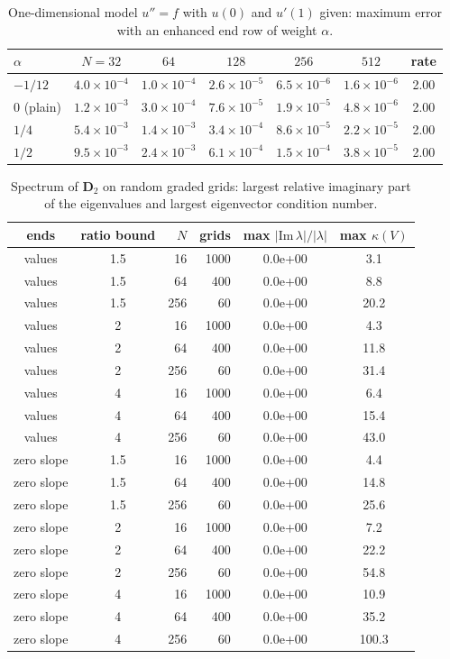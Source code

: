 \documentclass[11pt]{article}
\begin{document}
\begin{table}[htbp]\centering\small
\caption{One-dimensional model $u''=f$ with $u(0)$ and $u'(1)$ given: maximum error with an enhanced end row of weight $\alpha$.}
\begin{tabular}{l ccccc c}
\toprule
$\alpha$ & $N=32$ & $64$ & $128$ & $256$ & $512$ & rate\\
\midrule
$-1/12$ & $4.0{\times}10^{-4}$ & $1.0{\times}10^{-4}$ & $2.6{\times}10^{-5}$ & $6.5{\times}10^{-6}$ & $1.6{\times}10^{-6}$ & 2.00\\
0 (plain) & $1.2{\times}10^{-3}$ & $3.0{\times}10^{-4}$ & $7.6{\times}10^{-5}$ & $1.9{\times}10^{-5}$ & $4.8{\times}10^{-6}$ & 2.00\\
$1/4$ & $5.4{\times}10^{-3}$ & $1.4{\times}10^{-3}$ & $3.4{\times}10^{-4}$ & $8.6{\times}10^{-5}$ & $2.2{\times}10^{-5}$ & 2.00\\
$1/2$ & $9.5{\times}10^{-3}$ & $2.4{\times}10^{-3}$ & $6.1{\times}10^{-4}$ & $1.5{\times}10^{-4}$ & $3.8{\times}10^{-5}$ & 2.00\\
\bottomrule
\end{tabular}
\end{table}

\clearpage
\begin{table}[htbp]\centering\small
\caption{Spectrum of $\mathbf D_2$ on random graded grids: largest relative imaginary part of the eigenvalues and largest eigenvector condition number.}
\begin{tabular}{cc r r cc}
\toprule
ends & ratio bound & $N$ & grids & max $|\mathrm{Im}\,\lambda|/|\lambda|$ & max $\kappa(V)$\\
\midrule
values & 1.5 & 16 & 1000 & 0.0e+00 & 3.1\\
values & 1.5 & 64 & 400 & 0.0e+00 & 8.8\\
values & 1.5 & 256 & 60 & 0.0e+00 & 20.2\\
values & 2 & 16 & 1000 & 0.0e+00 & 4.3\\
values & 2 & 64 & 400 & 0.0e+00 & 11.8\\
values & 2 & 256 & 60 & 0.0e+00 & 31.4\\
values & 4 & 16 & 1000 & 0.0e+00 & 6.4\\
values & 4 & 64 & 400 & 0.0e+00 & 15.4\\
values & 4 & 256 & 60 & 0.0e+00 & 43.0\\
zero slope & 1.5 & 16 & 1000 & 0.0e+00 & 4.4\\
zero slope & 1.5 & 64 & 400 & 0.0e+00 & 14.8\\
zero slope & 1.5 & 256 & 60 & 0.0e+00 & 25.6\\
zero slope & 2 & 16 & 1000 & 0.0e+00 & 7.2\\
zero slope & 2 & 64 & 400 & 0.0e+00 & 22.2\\
zero slope & 2 & 256 & 60 & 0.0e+00 & 54.8\\
zero slope & 4 & 16 & 1000 & 0.0e+00 & 10.9\\
zero slope & 4 & 64 & 400 & 0.0e+00 & 35.2\\
zero slope & 4 & 256 & 60 & 0.0e+00 & 100.3\\
\bottomrule
\end{tabular}
\end{table}
\end{document}
